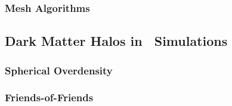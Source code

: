 \subsubsection{Mesh Algorithms}
\label{subsubsec:computational_theory--nbody_simulations--mesh_algorithms}




\subsection{Dark Matter Halos in \nbody\ Simulations}
\label{subsec:computational_theory--halos_in_nbody_simulations}



\subsubsection{Spherical Overdensity}
\label{subsubsec:computational_theory--halos_in_nbody_simulations--spherical_overdensity}



\subsubsection{Friends-of-Friends}
\label{subsubsec:computational_theory--halos_in_nbody_simulations--friends-of-friends}




